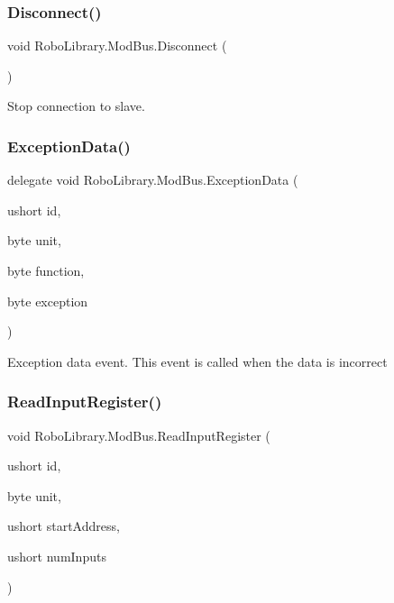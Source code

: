 \subsubsection{\texorpdfstring{Disconnect()}{Disconnect()}}
{\footnotesize\ttfamily void Robo\+Library.\+Mod\+Bus.\+Disconnect (\begin{DoxyParamCaption}{ }\end{DoxyParamCaption})}



Stop connection to slave.

\hypertarget{class_robo_library_1_1_mod_bus_ac78341a28ded6af9cc33c594315e7c06}{}\label{class_robo_library_1_1_mod_bus_ac78341a28ded6af9cc33c594315e7c06} 
\subsubsection{\texorpdfstring{Exception\+Data()}{ExceptionData()}}
{\footnotesize\ttfamily delegate void Robo\+Library.\+Mod\+Bus.\+Exception\+Data (\begin{DoxyParamCaption}\item[{ushort}]{id,  }\item[{byte}]{unit,  }\item[{byte}]{function,  }\item[{byte}]{exception }\end{DoxyParamCaption})}



Exception data event. This event is called when the data is incorrect

\hypertarget{class_robo_library_1_1_mod_bus_ac6c8875d17a35857e67b03d323242477}{}\label{class_robo_library_1_1_mod_bus_ac6c8875d17a35857e67b03d323242477} 
\subsubsection{\texorpdfstring{Read\+Input\+Register()}{ReadInputRegister()}\hspace{0.1cm}{\footnotesize\ttfamily [1/2]}}
{\footnotesize\ttfamily void Robo\+Library.\+Mod\+Bus.\+Read\+Input\+Register (\begin{DoxyParamCaption}\item[{ushort}]{id,  }\item[{byte}]{unit,  }\item[{ushort}]{start\+Address,  }\item[{ushort}]{num\+Inputs }\end{DoxyParamCaption})}



